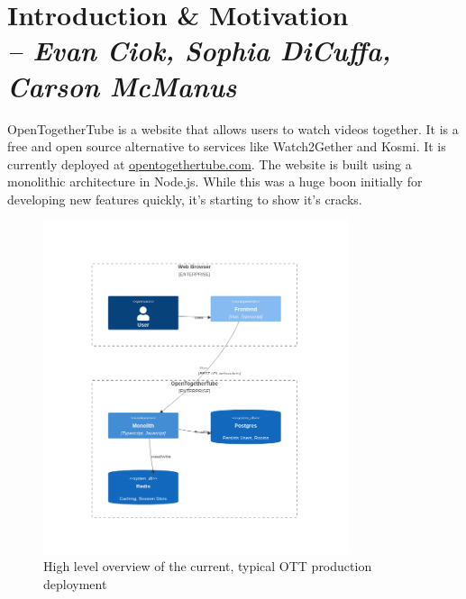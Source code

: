\chapter{Introduction \& Motivation \\
  \small{\textit{-- Evan Ciok, Sophia DiCuffa, Carson McManus}}
  \label{Chapter::Motivation}}

OpenTogetherTube is a website that allows users to watch videos together. It is a free and open source alternative to services like Watch2Gether and Kosmi. It is currently deployed at \href{https://opentogethertube.com}{opentogethertube.com}. The website is built using a monolithic architecture in Node.js. While this was a huge boon initially for developing new features quickly, it's starting to show it's cracks.

\begin{figure}[!h]
  \centering
  \includegraphics[width=0.8\textwidth]{Figures/deployment-current.png}
  \caption{High level overview of the current, typical OTT production deployment}
  \label{Figure::deployment-current}
\end{figure}

